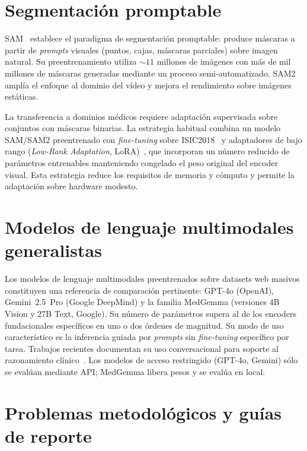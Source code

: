 \section{Segmentación promptable}
\label{sec:segmentacion-sota}

SAM~\cite{sam2023} establece el paradigma de segmentación
promptable: produce máscaras a partir de \emph{prompts} visuales
(puntos, cajas, máscaras parciales) sobre imagen natural. Su
preentrenamiento utiliza $\sim 11$ millones de imágenes con
más de mil millones de máscaras generadas mediante un proceso
semi-automatizado. SAM2~\cite{sam2} amplía el enfoque al dominio
del vídeo y mejora el rendimiento sobre imágenes estáticas.

La transferencia a dominios médicos requiere adaptación supervisada
sobre conjuntos con máscaras binarias. La estrategia habitual
combina un modelo SAM/SAM2 preentrenado con \emph{fine-tuning} sobre
ISIC2018~\cite{isic2018} y adaptadores de bajo rango
(\emph{Low-Rank Adaptation}, LoRA)~\cite{lora}, que
incorporan un número reducido de parámetros entrenables manteniendo
congelado el peso original del encoder visual. Esta estrategia
reduce los requisitos de memoria y cómputo y permite la adaptación
sobre hardware modesto.

\section{Modelos de lenguaje multimodales generalistas}
\label{sec:llm-multimodal}

Los modelos de lenguaje multimodales preentrenados sobre datasets web
masivos constituyen una referencia de comparación pertinente: GPT-4o
(OpenAI), Gemini~2.5~Pro (Google DeepMind) y la familia MedGemma
(versiones 4B Vision y 27B Text, Google). Su número de parámetros
supera al de los encoders fundacionales específicos en uno o dos
órdenes de magnitud. Su modo de uso característico es la inferencia
guiada por \emph{prompts} sin \emph{fine-tuning} específico por
tarea. Trabajos recientes documentan su uso conversacional para
soporte al razonamiento clínico~\cite{amie2024,deepmind_aicoclinician}.
Los modelos de acceso restringido (GPT-4o, Gemini) sólo se evalúan
mediante API; MedGemma libera pesos y se evalúa en local.

\section{Problemas metodológicos y guías de reporte}
\label{sec:problemas-metodologicos}

